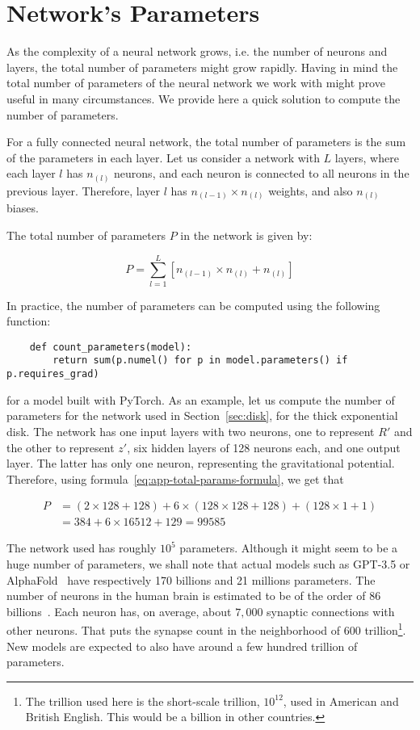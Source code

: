 \chapter{Network's Parameters}\label{app:num-parameters}

As the complexity of a neural network grows, i.e. the number of neurons and layers, the total number of parameters might grow rapidly. Having in mind the total number of parameters of the neural network we work with might prove useful in many circumstances. We provide here a quick solution to compute the number of parameters.


For a fully connected neural network, the total number of parameters is the sum of the parameters in each layer.
Let us consider a network with $L$ layers, where each layer $l$ has $n_{(l)}$ neurons, and each neuron is connected to all neurons in the previous layer. Therefore, layer $l$ has $n_{(l-1)} \times n_{(l)}$ weights, and also $n_{(l)}$ biases.

The total number of parameters $P$ in the network is given by:

\begin{equation}
    \label{eq:app-total-params-formula}
    P = \sum_{l=1}^{L} [n_{(l-1)} \times n_{(l)} + n_{(l)}]
\end{equation}

In practice, the number of parameters can be computed using the following function:

\begin{verbatim}
    def count_parameters(model): 
        return sum(p.numel() for p in model.parameters() if p.requires_grad) 
\end{verbatim} 
for a model built with PyTorch. As an example, let us compute the number of parameters for the network used in Section~\ref{sec:disk}, for the thick exponential disk. The network has one input layers with two neurons, one to represent $R'$ and the other to represent $z'$, six hidden layers of 128 neurons each, and one output layer. The latter has only one neuron, representing the gravitational potential. Therefore, using formula~\eqref{eq:app-total-params-formula}, we get that 

\begin{align*}
    P &= (2 \times 128 + 128) + 6 \times (128 \times 128 + 128) + (128 \times 1 + 1)\\
    &= 384 + 6 \times 16512 + 129 = 99585
\end{align*}
    
The network used has roughly $10^5$ parameters. Although it might seem to be a huge number of parameters, we shall note that actual models such as GPT-3.5 or AlphaFold~\cite{jumper2021highly} have respectively 170 billions and 21 millions parameters. The number of neurons in the human brain is estimated to be of the order of 86 billions~\cite{herculano2009human}. Each neuron has, on average, about $7,000$ synaptic connections with other neurons. That puts the synapse count in the neighborhood of $600$ trillion\footnote{The trillion used here is the short-scale trillion, $10^{12}$, used in American and British English. This would be a billion in other countries.}. New models are expected to also have around a few hundred trillion of parameters.